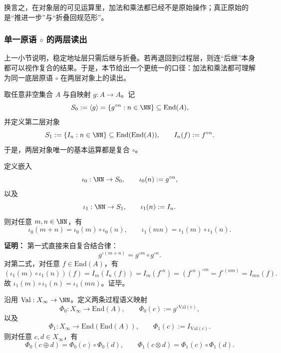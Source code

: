 换言之，在对象层的可见运算里，加法和乘法都已经不是原始操作；真正原始的是“推进一步”与“折叠回规范形”。

\subsubsection{单一原语 \texorpdfstring{$\circ$}{o} 的两层读出}\label{subsec:arith-composition}
上一小节说明，稳定地址层只需后继与折叠。若再退回到过程层，则连“后继”本身都可以视作复合的结果。于是，本节给出一个更统一的口径：加法和乘法都可理解为同一底层原语 \(\circ\) 在两层对象上的读出。

取任意非空集合 \(A\) 与自映射 \(g:A\to A\)。记
\[
S_0:=\langle g\rangle=\{g^{\circ n}:n\in\NN\}\subseteq \mathrm{End}(A),
\]
并定义第二层对象
\[
S_1:=\{I_n:n\in\NN\}\subseteq \mathrm{End}(\mathrm{End}(A)),
\qquad
I_n(f):=f^{\circ n}.
\]
于是，两层对象唯一的基本运算都是复合 \(\circ\)。

\begin{theorem}\label{thm:composition-two-layer}
定义嵌入
\[
\iota_0:\NN\to S_0,\qquad \iota_0(n):=g^{\circ n},
\]
以及
\[
\iota_1:\NN\to S_1,\qquad \iota_1(n):=I_n.
\]
则对任意 \(m,n\in\NN\)，有
\[
\iota_0(m+n)=\iota_0(m)\circ \iota_0(n),
\qquad
\iota_1(mn)=\iota_1(m)\circ \iota_1(n).
\]
\end{theorem}

\textbf{证明：}
第一式直接来自复合结合律：
\[
g^{\circ(m+n)}=g^{\circ m}\circ g^{\circ n}.
\]
对第二式，对任意 \(f\in \mathrm{End}(A)\)，有
\[
(\iota_1(m)\circ \iota_1(n))(f)
=I_m(I_n(f))
=I_m(f^{\circ n})
=(f^{\circ n})^{\circ m}
=f^{\circ(nm)}
=I_{mn}(f).
\]
故 \(\iota_1(m)\circ \iota_1(n)=\iota_1(mn)\)。证毕。

\begin{theorem}\label{thm:arith-composition}
沿用 \(\mathrm{Val}:X_\infty\to\NN\)。定义两条过程语义映射
\[
\Phi_0:X_\infty\to \mathrm{End}(A),\qquad
\Phi_0(c):=g^{\circ \mathrm{Val}(c)},
\]
以及
\[
\Phi_1:X_\infty\to \mathrm{End}(\mathrm{End}(A)),\qquad
\Phi_1(c):=I_{\mathrm{Val}(c)}.
\]
则对任意 \(c,d\in X_\infty\)，有
\[
\Phi_0(c\oplus d)=\Phi_0(c)\circ \Phi_0(d),
\qquad
\Phi_1(c\otimes d)=\Phi_1(c)\circ \Phi_1(d).
\]
\end{theorem}

